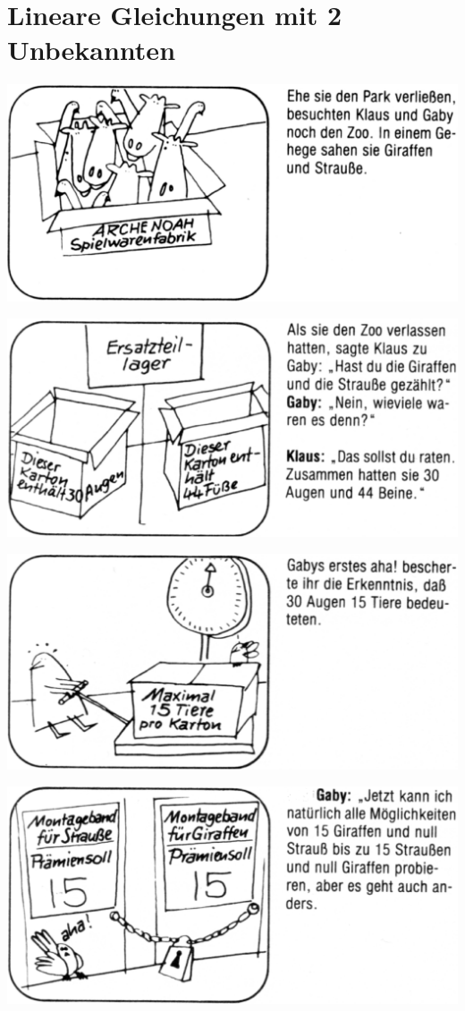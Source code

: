 \documentclass[%
11pt,%
twoside,%
titlepage,%
german,%
]{scrartcl}
\begin{document}
\begin{enumerate}
\end{enumerate}

\label{lingltext}

\section{Lineare Gleichungen mit 2 Unbekannten}

\medskip
	\includegraphics[width=0.9\columnwidth,bb=14 14 954 470]{pictures/augenbeine1t.eps}

\medskip
	\includegraphics[width=0.9\columnwidth,bb=14 14 954 470]{pictures/augenbeine2t.eps}

\medskip
	\includegraphics[width=0.9\columnwidth,bb=14 14 956 467]{pictures/augenbeine3t.eps}

\medskip
	\includegraphics[width=0.9\columnwidth,bb=14 14 955 468]{pictures/augenbeine4t.eps}
\end{document}
